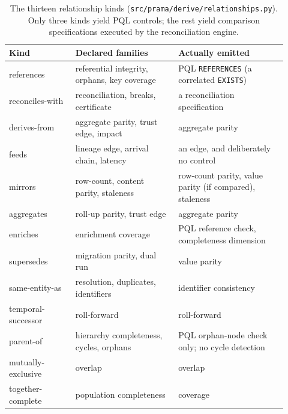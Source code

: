 \documentclass[11pt,a4paper]{article}
\renewcommand{\_}{\oldunderscore\allowbreak}
\theoremstyle{plain}
\theoremstyle{definition}
\theoremstyle{remark}
\newcommand{\pql}[1]{\texttt{#1}}
\begin{document}
\begin{table}[t]
\centering\small
\begin{tabular}{@{}L{0.22\linewidth}L{0.34\linewidth}L{0.36\linewidth}@{}}
\toprule
\textbf{Kind} & \textbf{Declared families} & \textbf{Actually emitted} \\
\midrule
references & referential integrity, orphans, key coverage & PQL \pql{REFERENCES} (a correlated \pql{EXISTS}) \\
reconciles-with & reconciliation, breaks, certificate & a reconciliation specification \\
derives-from & aggregate parity, trust edge, impact & aggregate parity \\
feeds & lineage edge, arrival chain, latency & an edge, and deliberately no control \\
mirrors & row-count, content parity, staleness & row-count parity, value parity (if compared), staleness \\
aggregates & roll-up parity, trust edge & aggregate parity \\
enriches & enrichment coverage & PQL reference check, completeness dimension \\
supersedes & migration parity, dual run & value parity \\
same-entity-as & resolution, duplicates, identifiers & identifier consistency \\
temporal-successor & roll-forward & roll-forward \\
parent-of & hierarchy completeness, cycles, orphans & PQL orphan-node check only; no cycle detection \\
mutually-exclusive & overlap & overlap \\
together-complete & population completeness & coverage \\
\bottomrule
\end{tabular}
\caption{The thirteen relationship kinds (\texttt{src/prama/derive/relationships.py}). Only three kinds
yield PQL controls; the rest yield comparison specifications executed by the reconciliation engine.}
\label{tab:relkinds}
\end{table}
\end{document}
